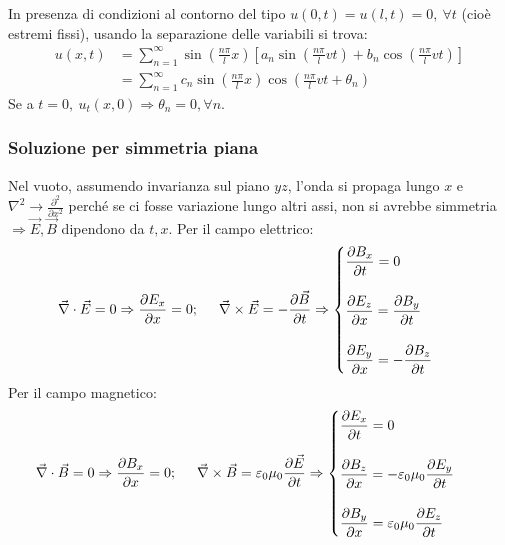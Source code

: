 \documentclass[a4paper]{scrartcl}
\numberwithin{equation}{subsection}
\theoremstyle{style1}
\begin{document}
In presenza di condizioni al contorno del tipo $u(0,t) = u(l,t) = 0, \ \forall t$ (cio\`e estremi fissi), usando la separazione delle variabili si trova:
\begin{equation}
	\begin{split}
		u (x,t) &= \sum_{n=1}^{\infty} \sin\left(\frac{n\pi}{l}x\right) \left[ a_n \sin\left(\frac{n\pi}{l}vt\right) + b_n   \cos \left(\frac{n\pi}{l}vt\right) \right] \\
		&= \sum_{n=1}^{\infty} c_n \sin\left(\frac{n\pi}{l}x\right) \cos \left(\frac{n\pi}{l}vt + \theta _n\right) 
	\end{split}
\end{equation}
Se a $t=0, \ u_t (x,0)\Rightarrow \theta _n=0, \forall n$.


\subsubsection{Soluzione per simmetria piana}
Nel vuoto, assumendo invarianza sul piano $yz$, l'onda si propaga lungo $x$ e $\nabla^2 \to \frac{\partial^2 }{\partial x^2} $ perch\'e se ci fosse variazione lungo altri assi, non si avrebbe simmetria $\Rightarrow \vec{E},\vec{B}$ dipendono da $t,x$. Per il campo elettrico:
\begin{equation}
	\begin{split}
		&\vec{\nabla }\cdot \vec{E}=0 \Rightarrow \frac{\partial E_x}{\partial x} =0; \hspace{.5cm} \vec{\nabla }\times \vec{E}= - \frac{\partial \vec{B}}{\partial t} \Rightarrow \begin{cases}
			\displaystyle \frac{\partial B_x}{\partial t} = 0\\
			\\
			\displaystyle \frac{\partial E_z}{\partial x} = \frac{\partial B_y}{\partial t} \\
			\\
			\displaystyle \frac{\partial E_y}{\partial x} =- \frac{\partial B_z}{\partial t} 
		\end{cases}
	\end{split}
\end{equation}
Per il campo magnetico:
\begin{equation}
	\begin{split}
		&\vec{\nabla }\cdot \vec{B} = 0\Rightarrow \frac{\partial B_x}{\partial x} =0; \hspace{.5cm} \vec{\nabla }\times \vec{B}= \varepsilon _0 \mu _0 \frac{\partial \vec{E}}{\partial t} \Rightarrow \begin{cases}
			\displaystyle \frac{\partial E_x}{\partial t} =0\\
			\\
			\displaystyle \frac{\partial B_z}{\partial x} =-\varepsilon _0\mu _0 \frac{\partial E_y}{\partial t} \\
			\\
			\displaystyle \frac{\partial B_y}{\partial x} = \varepsilon _0 \mu _0 \frac{\partial E_z}{\partial t} 
		\end{cases}
	\end{split}
\end{equation}
\end{document}
